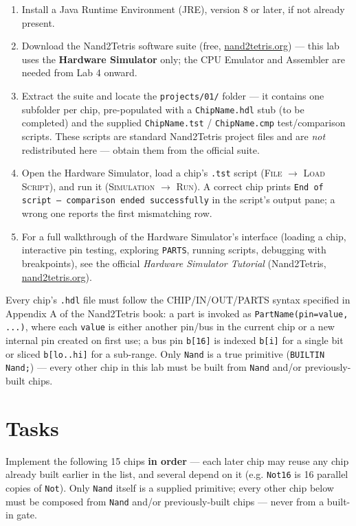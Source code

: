\documentclass[11pt]{article}
\begin{document}
\begin{enumerate}
  \item Install a Java Runtime Environment (JRE), version 8 or later, if not already present.
  \item Download the Nand2Tetris software suite (free, \url{nand2tetris.org}) --- this lab uses the \textbf{Hardware Simulator} only; the CPU Emulator and Assembler are needed from Lab 4 onward.
  \item Extract the suite and locate the \texttt{projects/01/} folder --- it contains one subfolder per chip, pre-populated with a \texttt{ChipName.hdl} stub (to be completed) and the supplied \texttt{ChipName.tst} / \texttt{ChipName.cmp} test/comparison scripts. These scripts are standard Nand2Tetris project files and are \emph{not} redistributed here --- obtain them from the official suite.
  \item Open the Hardware Simulator, load a chip's \texttt{.tst} script (\textsc{File} $\to$ \textsc{Load Script}), and run it (\textsc{Simulation} $\to$ \textsc{Run}). A correct chip prints \texttt{End of script --- comparison ended successfully} in the script's output pane; a wrong one reports the first mismatching row.
  \item For a full walkthrough of the Hardware Simulator's interface (loading a chip, interactive pin testing, exploring \texttt{PARTS}, running scripts, debugging with breakpoints), see the official \emph{Hardware Simulator Tutorial} (Nand2Tetris, \url{nand2tetris.org}).
\end{enumerate}

Every chip's \texttt{.hdl} file must follow the CHIP/IN/OUT/PARTS syntax specified in Appendix A of the Nand2Tetris book: a part is invoked as \texttt{PartName(pin=value, ...)}, where each \texttt{value} is either another pin/bus in the current chip or a new internal pin created on first use; a bus pin \texttt{b[16]} is indexed \texttt{b[i]} for a single bit or sliced \texttt{b[lo..hi]} for a sub-range. Only \texttt{Nand} is a true primitive (\texttt{BUILTIN Nand;}) --- every other chip in this lab must be built from \texttt{Nand} and/or previously-built chips.

\section{Tasks}

Implement the following 15 chips \textbf{in order} --- each later chip may reuse any chip already built earlier in the list, and several depend on it (e.g. \texttt{Not16} is 16 parallel copies of \texttt{Not}). Only \texttt{Nand} itself is a supplied primitive; every other chip below must be composed from \texttt{Nand} and/or previously-built chips --- never from a built-in gate.
\end{document}
